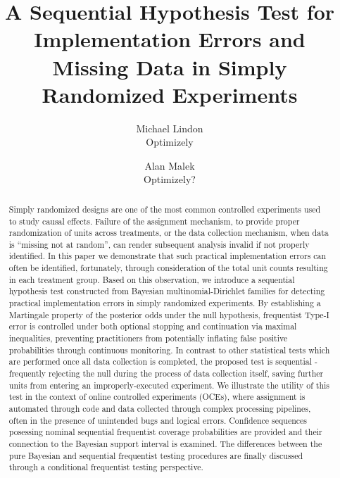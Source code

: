\documentclass[11pt]{article}
\begin{document}
\vspace{-1in}
\title{A Sequential Hypothesis Test for Implementation Errors and Missing Data in Simply Randomized Experiments}
\author{\Large Michael Lindon \\ Optimizely \and Alan Malek \\ Optimizely?}
\maketitle 
\begin{abstract}
  Simply randomized designs are one of the most common controlled experiments used to study causal effects.
  Failure of the assignment mechanism, to provide proper randomization of units across treatments, or the data collection mechanism, when data is ``missing not at random'', can render subsequent analysis invalid if not properly identified.
In this paper we demonstrate that such practical implementation errors can often be identified, fortunately, through consideration of the total unit counts resulting in each treatment group.
  Based on this observation, we introduce a sequential hypothesis test constructed from Bayesian multinomial-Dirichlet families for detecting practical implementation errors in simply randomized experiments.
By establishing a Martingale property of the posterior odds under the null hypothesis, frequentist Type-I error is controlled under both optional stopping and continuation via maximal inequalities, preventing practitioners from potentially inflating false positive probabilities through continuous monitoring.
  In contrast to other statistical tests which are performed once all data collection is completed, the proposed test is sequential - frequently rejecting the null during the process of data collection itself, saving further units from entering an improperly-executed experiment.
  We illustrate the utility of this test in the context of online controlled experiments (OCEs), where assignment is automated through code and data collected through complex processing pipelines, often in the presence of unintended bugs and logical errors.
Confidence sequences posessing nominal sequential frequentist coverage probabilities are provided and their connection to the Bayesian support interval is examined.
The differences between the pure Bayesian and sequential frequentist testing procedures are finally discussed through a conditional frequentist testing perspective.
 
\end{abstract}
\end{document}
